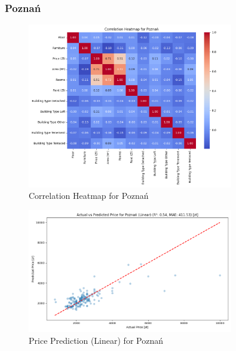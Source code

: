 \subsubsection{Poznań}
\begin{figure}[H]
    \centering
    \includegraphics[width=0.8\textwidth]{figures/poznan_correlation_heatmap.png}
    \caption{Correlation Heatmap for Poznań}
\end{figure}
\begin{figure}[H]
    \centering
    \includegraphics[width=0.8\textwidth]{figures/poznan_price_prediction_linear.png}
    \caption{Price Prediction (Linear) for Poznań}
\end{figure}

